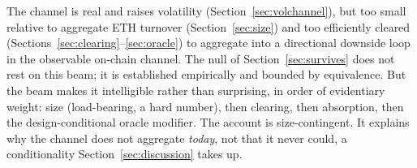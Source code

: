 The channel is real and raises volatility (Section~\ref{sec:volchannel}), but
too small relative to aggregate ETH turnover (Section~\ref{sec:size}) and too
efficiently cleared (Sections~\ref{sec:clearing}--\ref{sec:oracle}) to
aggregate into a directional downside loop in the observable on-chain channel. The null of
Section~\ref{sec:survives} does not rest on this beam; it is established
empirically and bounded by equivalence. But the beam makes it
intelligible rather than surprising, in order of evidentiary weight: size
(load-bearing, a hard number), then clearing, then absorption, then the
design-conditional oracle modifier. The account is size-contingent. It explains why the channel does not aggregate
\emph{today}, not that it never could, a conditionality
Section~\ref{sec:discussion} takes up.